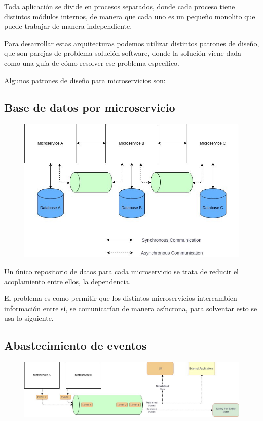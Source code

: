 \documentclass[12pt]{report} %
\begin{document}
Toda aplicación se divide en procesos separados, donde cada proceso tiene distintos módulos internos, de manera que cada uno es un pequeño monolito que puede trabajar de  manera independiente.

Para desarrollar estas arquitecturas podemos utilizar distintos patrones de diseño, que son parejas de problema-solución software, donde la solución viene dada como una guía de cómo resolver ese problema específico.

Algunos patrones de diseño para microservicios son:

\subsection{Base de datos por microservicio}
\begin{figure}[H]
	{\includegraphics[scale=.3]{1_WWJQH50jxgrqh-ABFRQuzQ.jpeg}}
\end{figure}

Un único repositorio de datos para cada microservicio se trata de reducir el acoplamiento entre ellos, la dependencia.

El problema es como permitir que los distintos microservicios intercambien información entre sí, se comunicarían de manera asíncrona, para solventar esto se usa lo siguiente.

\subsection{Abastecimiento de eventos}
\begin{figure}[H]
	{\includegraphics[scale=.3]{1_tRDaroNg_GnGdCZDFxLFKQ.jpeg}}
\end{figure}
\end{document}
